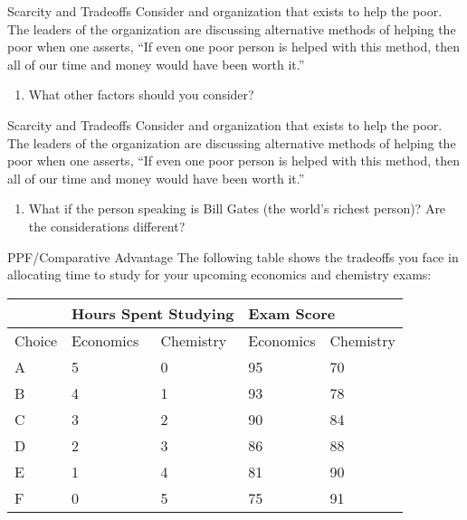 \documentclass{beamer}
\begin{document}
\begin{frame}[t]{Scarcity and Tradeoffs}
    Consider and organization that exists to help the poor. The leaders of the organization are discussing alternative methods of helping the poor when one asserts, “If even one poor person is helped with this method, then all of our time and money would have been worth it.”
    \begin{enumerate}
        \item[2.] What other factors should you consider?
    \end{enumerate}
\end{frame}

\begin{frame}[t]{Scarcity and Tradeoffs}
    Consider and organization that exists to help the poor. The leaders of the organization are discussing alternative methods of helping the poor when one asserts, “If even one poor person is helped with this method, then all of our time and money would have been worth it.”
    \begin{enumerate}
        \item[3.] What if the person speaking is Bill Gates (the world’s richest person)? Are the considerations different?
    \end{enumerate}
\end{frame}

\begin{frame}{PPF/Comparative Advantage}
    The following table shows the tradeoffs you face in allocating time to study for your upcoming economics and chemistry exams:
    \begin{table}[]
    \begin{tabular}{l|l|l|l|l|}
    \cline{2-5}
                                 & \multicolumn{2}{l|}{Hours Spent Studying} & \multicolumn{2}{l|}{Exam Score} \\ \hline
    \multicolumn{1}{|l|}{Choice} & Economics           & Chemistry           & Economics      & Chemistry      \\ \hline
    \multicolumn{1}{|l|}{A}      & 5                   & 0                   & 95             & 70             \\ \hline
    \multicolumn{1}{|l|}{B}      & 4                   & 1                   & 93             & 78             \\ \hline
    \multicolumn{1}{|l|}{C}      & 3                   & 2                   & 90             & 84             \\ \hline
    \multicolumn{1}{|l|}{D}      & 2                   & 3                   & 86             & 88             \\ \hline
    \multicolumn{1}{|l|}{E}      & 1                   & 4                   & 81             & 90             \\ \hline
    \multicolumn{1}{|l|}{F}      & 0                   & 5                   & 75             & 91             \\ \hline
    \end{tabular}
    \end{table}
\end{frame}
\end{document}
